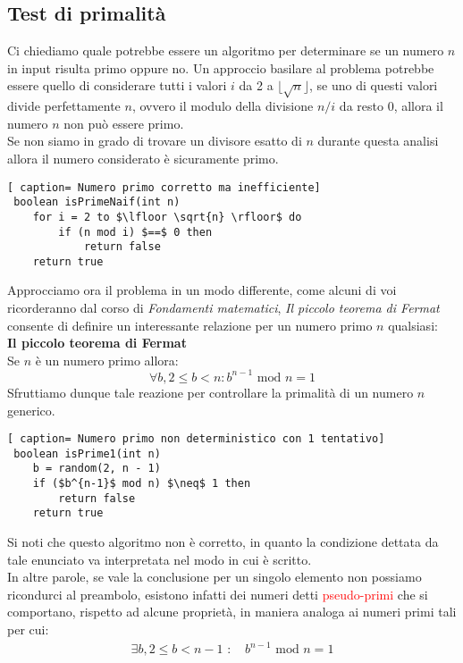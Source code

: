 \documentclass[../cheatSheetAlgoritmi.tex]{subfiles}
\begin{document}
\subsection{Test di primalità}
Ci chiediamo quale potrebbe essere un algoritmo per determinare se un numero $n$ in input risulta primo oppure no. 
Un approccio basilare al problema potrebbe essere quello di considerare tutti i valori $i$ da 2 a $\lfloor \sqrt{n} \rfloor$, se uno di questi valori divide perfettamente $n$, ovvero il modulo della divisione $n/i$ da resto $0$, allora il numero $n$ non può essere primo. \\
Se non siamo in grado di trovare un divisore esatto di $n$ durante questa analisi allora il numero considerato è sicuramente primo. 
 \begin{lstlisting}[ caption= Numero primo corretto ma inefficiente]
 boolean isPrimeNaif(int n)
 	for i = 2 to $\lfloor \sqrt{n} \rfloor$ do
 		if (n mod i) $==$ 0 then
 			return false
 	return true
\end{lstlisting}
Approcciamo ora il problema in un modo differente, come alcuni di voi ricorderanno dal corso di \emph{Fondamenti matematici}, \emph{Il piccolo teorema di Fermat} consente di definire un interessante relazione per un numero primo $n$ qualsiasi: \\
\textbf{Il piccolo teorema di Fermat} \\
Se $n$ è un numero primo allora:
\begin{equation*}
    \forall b, 2 \leq b < n : \text{$b^{n-1}$ mod $n = 1$}
\end{equation*}
Sfruttiamo dunque tale reazione per controllare la primalità di un numero $n$ generico.
 \begin{lstlisting}[ caption= Numero primo non deterministico con 1 tentativo]
 boolean isPrime1(int n)
 	b = random(2, n - 1)
 	if ($b^{n-1}$ mod n) $\neq$ 1 then
 		return false
 	return true
\end{lstlisting}
Si noti che questo algoritmo non è corretto, in quanto la condizione dettata da tale enunciato va interpretata nel modo in cui è scritto. \\
In altre parole, se vale la conclusione per un singolo elemento non possiamo ricondurci al preambolo, esistono infatti dei numeri detti \textcolor{red}{pseudo-primi} che si comportano, rispetto ad alcune proprietà, in maniera analoga ai numeri primi tali per cui: 
\begin{align*}
    \exists b, 2 \leq b < n - 1\text{ : } & \text{$b^{n-1}$ mod $n = 1$}
\end{align*}
\end{document}
